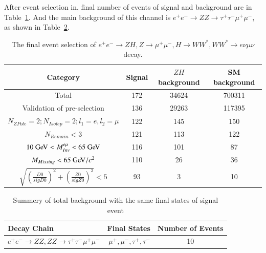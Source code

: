 \documentclass[11pt,a4paper]{cepcnote}
\begin{document}
After event selection in, final number of events of signal and background are in Table~\ref{tab:emu}. And the main background of this channel is 
 $e^+e^-\rightarrow  ZZ\rightarrow\tau^+\tau^-\mu^+\mu^- $, as shown in Table~\ref{tab:uueubkg}.
\begin{table}[H]
\begin{center}
\begin{tabular}{cccc}
\hline \hline
\multicolumn{1}{c}{Category} & \multicolumn{1}{c}{Signal}&\multicolumn{1}{c}{$ZH$ background}&\multicolumn{1}{c}{SM background}\\   
\hline
  Total                                                 &     172   & 34624 &700311\\
  Validation of pre-selection				            &     136   & 29263 & 117395\\
  $N_{ZPole}=2; N_{Isolep}=2; l_1 = e, l_2 = \mu$       &     122   &   145 &   150  \\
  $N_{Remain} < 3$                                      &     121   &   113 &   122   \\
  $10\gev < M_{Inv}^{e\mu} < 65\gev$                    &     116   &   101 &   87  \\
  $M_{Missing} < 65\gev/c^2$                      		&     110   &   26  &   36   \\
  $\sqrt{(\frac{D0}{sigD0})^2+(\frac{Z0}{sigZ0})^2} < 5$&     93    &   3   &   10   \\
  \hline \hline
  \end{tabular}
  \caption[Monte Carlo purities in the single lepton sample]{%
	  The final event selection of $e^+e^-\rightarrow ZH, Z\rightarrow\mu^+\mu^-, H\rightarrow WW^*, WW^*\rightarrow e\nu\mu\nu$ decay.}
\label{tab:emu}
\end{center}
\end{table}
\begin{table}[H]
\begin{center}
\begin{tabular}{lrc}
\hline\hline
Decay Chain	& Final States 	&	Number of Events\\
\hline
$e^+e^-\rightarrow ZZ, ZZ\rightarrow\tau^+\tau^-\mu^+\mu^- $	& $\mu^+, \mu^-, \tau^+, \tau^-$			&10	\\
\hline\hline
\end{tabular}
\caption{Summery of total background with the same final states of signal event}
\label{tab:uueubkg}
\end{center}
\end{table}
\end{document}
